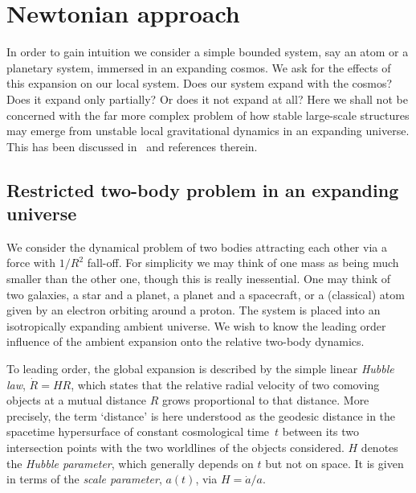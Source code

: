\documentclass
[rmp,aps,twocolumn,showpacs,preprintnumbers,amsmath,amssymb]{revtex4}
\theoremstyle{plain}
\theoremstyle{definition}
\theoremstyle{remark}
\begin{document}
\section{Newtonian approach}
\label{sec:NewtonianApproach}
%
In order to gain intuition we consider a simple bounded system, say 
an atom or a planetary system, immersed in an expanding cosmos. 
We ask for the effects of this expansion on our local system. 
Does our system expand with the cosmos? Does it expand only partially? 
Or does it not expand at all? Here we shall not be concerned with the 
far more complex problem of how stable large-scale structures may 
emerge from unstable local gravitational dynamics in an expanding 
universe. This has been discussed in~\cite{Buchert.Dominguez:2005}
and references therein. 


\subsection{Restricted two-body problem in an expanding universe}
%
We consider the dynamical problem of two bodies attracting 
each other via a force with $1/R^2$ fall-off. For simplicity 
we may think of one mass as being much smaller than the other 
one, though this is really inessential. One may think of 
two galaxies, a star and a planet, a planet and a spacecraft, 
or a (classical) atom given by an electron orbiting around a 
proton. The system is placed into an isotropically expanding 
ambient universe. We wish to know the leading order influence 
of the ambient expansion onto the relative two-body dynamics. 

To leading order, the global expansion is described by the 
simple linear \emph{Hubble law}, $\dot R=HR$, which states that 
the relative radial velocity of two comoving objects at a 
mutual distance $R$ grows proportional to that distance. 
More precisely, the term `distance' is here understood as 
the geodesic distance in the spacetime hypersurface of 
constant cosmological time~$t$ between its two intersection 
points with the two worldlines of the objects considered. 
$H$ denotes the 
\emph{Hubble parameter}, which generally depends on $t$ but not 
on space. It is given in terms of the \emph{scale parameter}, 
$a(t)$, via $H=\dot a/a$.
\end{document}
